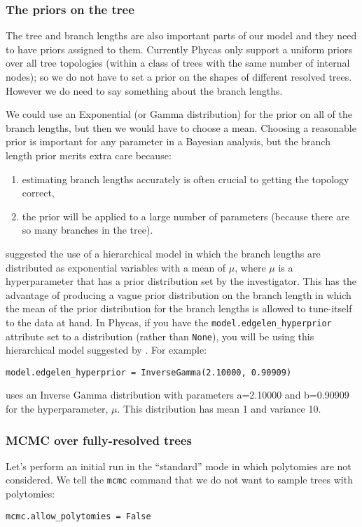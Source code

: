 \documentclass{article}
\newcommand{\cmd}[1]{\texttt{#1}\xspace}
\newcommand{\phycas}{Phycas\xspace}
\begin{document}
\subsubsection{The priors on the tree}
The tree and branch lengths are also important parts of our model and they need to have
priors assigned to them.
Currently \phycas only support a uniform priors over all tree topologies (within a
class of trees with the same number of internal nodes); so we do not have to set
a prior on the shapes of different resolved trees.
However we do need to say something about the branch lengths.

We could use an Exponential (or Gamma distribution) for the prior on all of the branch lengths, but then we would have to choose a mean.
Choosing a reasonable prior is important for any parameter in a Bayesian analysis, but 
the branch length prior merits extra care because:
\begin{enumerate}
	\item  estimating branch lengths accurately is often crucial to getting the topology correct,
	\item the prior will be applied to a large number of parameters (because there are so many branches in the tree).
\end{enumerate}
\citet{SuchardWS2001} suggested the use of a hierarchical model in which the branch lengths are distributed as exponential variables with a mean of $\mu$, where $\mu$ is a hyperparameter that 
has a prior distribution set by the investigator.
This has the advantage of producing a vague prior distribution on the branch length in which the 
mean of the prior distribution for the branch lengths is allowed to tune-itself to the data at hand.
In \phycas, if you have the \cmd{model.edgelen\_hyperprior} attribute set to a distribution (rather than \texttt{None}), you will be using this hierarchical model suggested by \citet{SuchardWS2001}.
For example:
\begin{verbatim}
model.edgelen_hyperprior = InverseGamma(2.10000, 0.90909)
\end{verbatim}
uses an Inverse Gamma distribution with parameters a=2.10000 and b=0.90909 for the hyperparameter, $\mu$.
This distribution has mean 1 and variance 10.

\subsubsection{MCMC over fully-resolved trees}
Let's perform an initial run in the ``standard'' mode in which polytomies are not considered.
We tell the \cmd{mcmc} command that we do not want to sample trees with polytomies:
\begin{verbatim}
mcmc.allow_polytomies = False
\end{verbatim}
\end{document}
